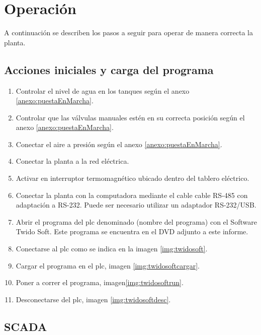 \section{Operación}
\label{anexo:operacion}

A continuación se describen los pasos a seguir para operar 
de manera correcta la planta.

\subsection{Acciones iniciales y carga del programa}

\begin{enumerate}
 \item Controlar el nivel de agua en los tanques según el anexo \ref{anexo:puestaEnMarcha}.
 \item Controlar que las válvulas manuales estén en su correcta
 posición según el anexo \ref{anexo:puestaEnMarcha}.
 \item Conectar el aire a presión según el anexo \ref{anexo:puestaEnMarcha}.
 \item Conectar la planta a la red eléctrica.
 \item Activar en interruptor termomagnético ubicado dentro del tablero
 eléctrico.
 \item Conectar la planta con la computadora mediante el cable cable RS-485 
 con adaptación a RS-232. Puede ser necesario utilizar un adaptador RS-232/USB.
 \item Abrir el programa del \gls{plc} denominado {\color{red}(nombre del programa)} 
 con el Software Twido Soft. Este programa se encuentra en el DVD adjunto a este 
 informe.
 \item Conectarse al \gls{plc} como se indica en la imagen \ref{img:twidosoft}.
 \item Cargar el programa en el \gls{plc}, imagen \ref{img:twidosoftcargar}.
 \item Poner a correr el programa, imagen\ref{img:twidosoftrun}.
 \item Desconectarse del \gls{plc}, imagen \ref{img:twidosoftdesc}.
\end{enumerate}
\subsection{SCADA}